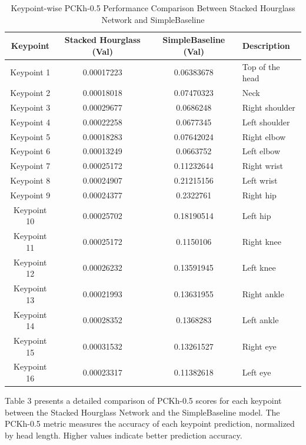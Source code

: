 \documentclass{article}
\begin{document}
\begin{table}[htpb]
    \centering
    \caption{Keypoint-wise PCKh-0.5 Performance Comparison Between Stacked Hourglass Network and SimpleBaseline}
    \label{tab:keypoint_comparison}
    \begin{tabular}{|c|c|c|l|}
        \hline
        \textbf{Keypoint} & \textbf{Stacked Hourglass (Val)} & \textbf{SimpleBaseline (Val)} & \textbf{Description} \\ \hline
        Keypoint 1  & 0.00017223 & 0.06383678 & Top of the head     \\ \hline
        Keypoint 2  & 0.00018018 & 0.07470323 & Neck                \\ \hline
        Keypoint 3  & 0.00029677 & 0.0686248  & Right shoulder      \\ \hline
        Keypoint 4  & 0.00022258 & 0.0677345  & Left shoulder       \\ \hline
        Keypoint 5  & 0.00018283 & 0.07642024 & Right elbow         \\ \hline
        Keypoint 6  & 0.00013249 & 0.0663752  & Left elbow          \\ \hline
        Keypoint 7  & 0.00025172 & 0.11232644 & Right wrist         \\ \hline
        Keypoint 8  & 0.00024907 & 0.21215156 & Left wrist          \\ \hline
        Keypoint 9  & 0.00024377 & 0.2322761  & Right hip           \\ \hline
        Keypoint 10 & 0.00025702 & 0.18190514 & Left hip            \\ \hline
        Keypoint 11 & 0.00025172 & 0.1150106  & Right knee          \\ \hline
        Keypoint 12 & 0.00026232 & 0.13591945 & Left knee           \\ \hline
        Keypoint 13 & 0.00021993 & 0.13631955 & Right ankle         \\ \hline
        Keypoint 14 & 0.00028352 & 0.1368283  & Left ankle          \\ \hline
        Keypoint 15 & 0.00031532 & 0.13261527 & Right eye           \\ \hline
        Keypoint 16 & 0.00023317 & 0.11382618 & Left eye            \\ \hline
    \end{tabular}
\end{table}

Table 3 presents a detailed comparison of PCKh-0.5 scores for each keypoint between the Stacked Hourglass Network and the SimpleBaseline model. The PCKh-0.5 metric measures the accuracy of each keypoint prediction, normalized by head length. Higher values indicate better prediction accuracy.
\end{document}
